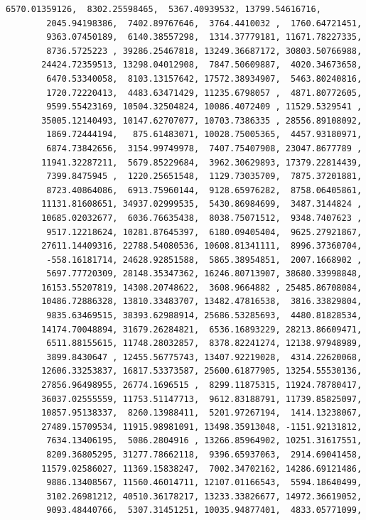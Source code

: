 \documentclass[11pt]{article}
\begin{document}
\begin{tcolorbox}[breakable, size=fbox, boxrule=.5pt, pad at break*=1mm, opacityfill=0]
\begin{Verbatim}[commandchars=\\\{\}]
        6570.01359126,  8302.25598465,  5367.40939532, 13799.54616716,
        2045.94198386,  7402.89767646,  3764.4410032 ,  1760.64721451,
        9363.07450189,  6140.38557298,  1314.37779181, 11671.78227335,
        8736.5725223 , 39286.25467818, 13249.36687172, 30803.50766988,
       24424.72359513, 13298.04012908,  7847.50609887,  4020.34673658,
        6470.53340058,  8103.13157642, 17572.38934907,  5463.80240816,
        1720.72220413,  4483.63471429, 11235.6798057 ,  4871.80772605,
        9599.55423169, 10504.32504824, 10086.4072409 , 11529.5329541 ,
       35005.12140493, 10147.62707077, 10703.7386335 , 28556.89108092,
        1869.72444194,   875.61483071, 10028.75005365,  4457.93180971,
        6874.73842656,  3154.99749978,  7407.75407908, 23047.8677789 ,
       11941.32287211,  5679.85229684,  3962.30629893, 17379.22814439,
        7399.8475945 ,  1220.25651548,  1129.73035709,  7875.37201881,
        8723.40864086,  6913.75960144,  9128.65976282,  8758.06405861,
       11131.81608651, 34937.02999535,  5430.86984699,  3487.3144824 ,
       10685.02032677,  6036.76635438,  8038.75071512,  9348.7407623 ,
        9517.12218624, 10281.87645397,  6180.09405404,  9625.27921867,
       27611.14409316, 22788.54080536, 10608.81341111,  8996.37360704,
        -558.16181714, 24628.92851588,  5865.38954851,  2007.1668902 ,
        5697.77720309, 28148.35347362, 16246.80713907, 38680.33998848,
       16153.55207819, 14308.20748622,  3608.9664882 , 25485.86708084,
       10486.72886328, 13810.33483707, 13482.47816538,  3816.33829804,
        9835.63469515, 38393.62988914, 25686.53285693,  4480.81828534,
       14174.70048894, 31679.26284821,  6536.16893229, 28213.86609471,
        6511.88155615, 11748.28032857,  8378.82241274, 12138.97948989,
        3899.8430647 , 12455.56775743, 13407.92219028,  4314.22620068,
       12606.33253837, 16817.53373587, 25600.61877905, 13254.55530136,
       27856.96498955, 26774.1696515 ,  8299.11875315, 11924.78780417,
       36037.02555559, 11753.51147713,  9612.83188791, 11739.85825097,
       10857.95138337,  8260.13988411,  5201.97267194,  1414.13238067,
       27489.15709534, 11915.98981091, 13498.35913048, -1151.92131812,
        7634.13406195,  5086.2804916 , 13266.85964902, 10251.31617551,
        8209.36805295, 31277.78662118,  9396.65937063,  2914.69041458,
       11579.02586027, 11369.15838247,  7002.34702162, 14286.69121486,
        9886.13408567, 11560.46014711, 12107.01166543,  5594.18640499,
        3102.26981212, 40510.36178217, 13233.33826677, 14972.36619052,
        9093.48440766,  5307.31451251, 10035.94877401,  4833.05771099,

\end{Verbatim}
\end{tcolorbox}
\end{document}
